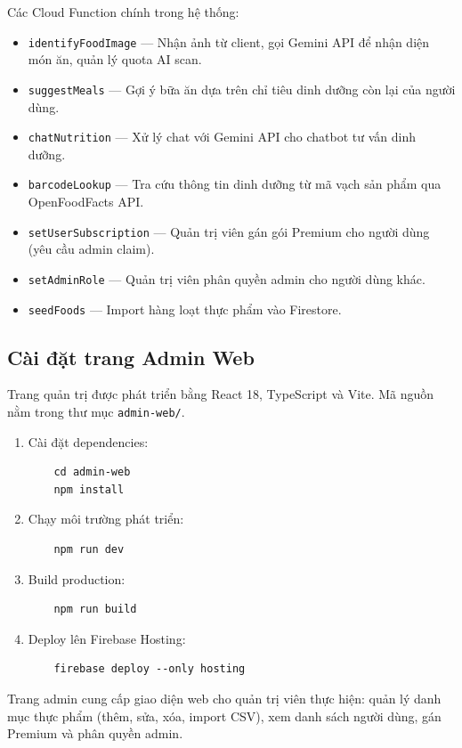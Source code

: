 Các Cloud Function chính trong hệ thống:
\begin{itemize}
    \item \texttt{identifyFoodImage} — Nhận ảnh từ client, gọi Gemini API để nhận diện món ăn, quản lý quota AI scan.
    \item \texttt{suggestMeals} — Gợi ý bữa ăn dựa trên chỉ tiêu dinh dưỡng còn lại của người dùng.
    \item \texttt{chatNutrition} — Xử lý chat với Gemini API cho chatbot tư vấn dinh dưỡng.
    \item \texttt{barcodeLookup} — Tra cứu thông tin dinh dưỡng từ mã vạch sản phẩm qua OpenFoodFacts API.
    \item \texttt{setUserSubscription} — Quản trị viên gán gói Premium cho người dùng (yêu cầu admin claim).
    \item \texttt{setAdminRole} — Quản trị viên phân quyền admin cho người dùng khác.
    \item \texttt{seedFoods} — Import hàng loạt thực phẩm vào Firestore.
\end{itemize}

\subsection{Cài đặt trang Admin Web}

Trang quản trị được phát triển bằng React 18, TypeScript và Vite. Mã nguồn nằm trong thư mục \texttt{admin-web/}.

\begin{enumerate}
    \item Cài đặt dependencies:
    \begin{verbatim}
    cd admin-web
    npm install
    \end{verbatim}
    \item Chạy môi trường phát triển:
    \begin{verbatim}
    npm run dev
    \end{verbatim}
    \item Build production:
    \begin{verbatim}
    npm run build
    \end{verbatim}
    \item Deploy lên Firebase Hosting:
    \begin{verbatim}
    firebase deploy --only hosting
    \end{verbatim}
\end{enumerate}

Trang admin cung cấp giao diện web cho quản trị viên thực hiện: quản lý danh mục thực phẩm (thêm, sửa, xóa, import CSV), xem danh sách người dùng, gán Premium và phân quyền admin.

